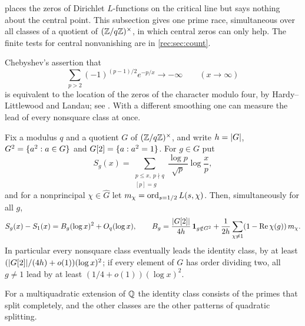  places the zeros of Dirichlet $L$-functions on the critical line but says nothing
about the central point. This subsection gives one prime race, simultaneous over all classes of a
quotient of $(\mathbb{Z}/q\mathbb{Z})^\times$, in which central zeros can only help. The finite tests for central
nonvanishing are in \cref{rec:sec:count}.

Chebyshev's assertion that
\[
 \sum_{p>2}(-1)^{(p-1)/2}e^{-p/x}\longrightarrow-\infty\qquad(x\to\infty)
\]
is equivalent to the location of the zeros of the character modulo four, by Hardy--Littlewood and Landau;
see \cite[\S1.2]{Suzuki2025Variants}.
With a different smoothing one can measure the lead of every nonsquare class at once.

\begin{theorem}\label{hec:thm:race}
Fix a modulus $q$ and a quotient $G$ of $(\mathbb{Z}/q\mathbb{Z})^\times$, and write $h=\lvert G\rvert$,
$G^2=\{a^2:a\in G\}$ and $G[2]=\{a:a^2=1\}$. For $g\in G$ put
\[
 S_g(x)=\sum_{\substack{p\le x,\ p\nmid q\\{}[p]=g}}\frac{\log p}{\sqrt p}\log\frac xp ,
\]
and for a nonprincipal $\chi\in\widehat G$ let $m_\chi=\operatorname{ord}_{s=1/2}L(s,\chi)$. Then, simultaneously for all
$g$,
\[
 S_g(x)-S_1(x)=B_g(\log x)^2+O_q(\log x),\qquad
 B_g=\frac{\lvert G[2]\rvert}{4h}\,\mathbf{1}_{g\notin G^2}+\frac1{2h}\sum_{\chi\ne1}(1-\operatorname{Re}\chi(g))\,m_\chi .
\]
In particular every nonsquare class eventually leads the identity class, by at least
$(\lvert G[2]\rvert/(4h)+o(1))(\log x)^2$; if every element of $G$ has order dividing two, all $g\ne1$ lead by at
least $(1/4+o(1))(\log x)^2$.
\end{theorem}

For a multiquadratic extension of $\mathbb{Q}$ the identity class consists of the primes that split completely,
and the other classes are the other patterns of quadratic splitting.


